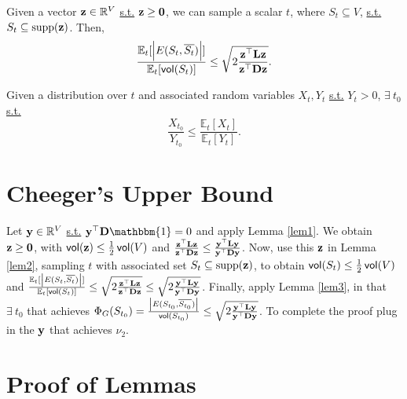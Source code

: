 \documentclass[11pt]{article}
\begin{document}
\begin{lemma} \label{lem2}
Given a vector $\V{z} \in \mathbb{R}^V$ \underline{s.t.} $\V{z}\geq\V{0}$, we can sample a scalar $t$, where $S_t \subseteq V$, \underline{s.t.} $S_t \subseteq \mathrm{supp}(\V{z})$. Then,
\begin{equation*}
\dfrac{\mathbb{E}_t[\abs{E(S_t,\overline{S_t})}]}{\mathbb{E}_t[\vol(S_t)]} \leq \sqrt{ 2\dfrac{\V{z}^{\top}\V{L}\V{z}}{\V{z}^{\top}\V{D}\V{z}} }.
\end{equation*}
\end{lemma}

\begin{lemma} \label{lem3}
Given a distribution over $t$ and associated random variables $X_t, Y_t$ \underline{s.t.} $Y_t > 0$, $\exists \  t_0$ \underline{s.t.}
\begin{equation*}
\dfrac{X_{t_0}}{Y_{t_0}} \leq \dfrac{\mathbb{E}_t[X_t]}{\mathbb{E}_t[Y_t]}.
\end{equation*}
\end{lemma}

\section{Cheeger's Upper Bound}

Let $\V{y} \in \mathbb{R}^V$ \underline{s.t.} $\V{y}^{\top}\V{D}\mathbbm{1}=0$ and apply Lemma \ref{lem1}. We obtain $\V{z} \geq \V{0}$, with $\vol(\mathrm{\V{z}}) \leq \frac{1}{2}\vol(V)$ and $\frac{\V{z}^{\top}\V{L}\V{z}}{\V{z}^{\top}\V{D}\V{z}} \leq \frac{\V{y}^{\top}\V{L}\V{y}}{\V{y}^{\top}\V{D}\V{y}}$. Now, use this $\V{z}$ in Lemma \ref{lem2}, sampling $t$ with associated set $S_t \subseteq \mathrm{supp(\V{z})}$, to obtain $\operatorname{\mathsf{vol}}(S_t) \leq \frac{1}{2}\operatorname{\mathsf{vol}}(V)$ and $\frac{\mathbb{E}_t[\abs{E(S_t,\overline{S_t})}]}{\mathbb{E}_t[\vol(S_t)]} \leq \sqrt{ 2\frac{\V{z}^{\top}\V{L}\V{z}}{\V{z}^{\top}\V{D}\V{z}} } \leq \sqrt{ 2\frac{\V{y}^{\top}\V{L}\V{y}}{\V{y}^{\top}\V{D}\V{y}} }$. Finally, apply Lemma \ref{lem3}, in that $\exists \ t_0$ that achieves $\Phi_G(S_{t_0}) = \frac{\abs{E(S_{t_0},\overline{S_{t_0}})}}{\vol(S_{t_0})} \leq \sqrt{ 2\frac{\V{y}^{\top}\V{L}\V{y}}{\V{y}^{\top}\V{D}\V{y}} }$. To complete the proof plug in the $\V{y}$ that achieves $\nu_2$.

\section{Proof of Lemmas}
\end{document}
